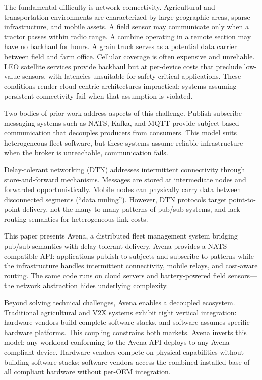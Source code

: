 \documentclass[journal]{IEEEtran}
\begin{document}
The fundamental difficulty is network connectivity. Agricultural and transportation environments are characterized by large geographic areas, sparse infrastructure, and mobile assets. A field sensor may communicate only when a tractor passes within radio range. A combine operating in a remote section may have no backhaul for hours. A grain truck serves as a potential data carrier between field and farm office. Cellular coverage is often expensive and unreliable. LEO satellite services provide backhaul but at per-device costs that preclude low-value sensors, with latencies unsuitable for safety-critical applications. These conditions render cloud-centric architectures impractical: systems assuming persistent connectivity fail when that assumption is violated.

Two bodies of prior work address aspects of this challenge. Publish-subscribe messaging systems such as NATS, Kafka, and MQTT provide subject-based communication that decouples producers from consumers. This model suits heterogeneous fleet software, but these systems assume reliable infrastructure---when the broker is unreachable, communication fails.

Delay-tolerant networking (DTN) addresses intermittent connectivity through store-and-forward mechanisms. Messages are stored at intermediate nodes and forwarded opportunistically. Mobile nodes can physically carry data between disconnected segments (``data muling''). However, DTN protocols target point-to-point delivery, not the many-to-many patterns of pub/sub systems, and lack routing semantics for heterogeneous link costs.

This paper presents Avena, a distributed fleet management system bridging pub/sub semantics with delay-tolerant delivery. Avena provides a NATS-compatible API: applications publish to subjects and subscribe to patterns while the infrastructure handles intermittent connectivity, mobile relays, and cost-aware routing. The same code runs on cloud servers and battery-powered field sensors---the network abstraction hides underlying complexity.

Beyond solving technical challenges, Avena enables a decoupled ecosystem. Traditional agricultural and V2X systems exhibit tight vertical integration: hardware vendors build complete software stacks, and software assumes specific hardware platforms. This coupling constrains both markets. Avena inverts this model: any workload conforming to the Avena API deploys to any Avena-compliant device. Hardware vendors compete on physical capabilities without building software stacks; software vendors access the combined installed base of all compliant hardware without per-OEM integration.
\end{document}
